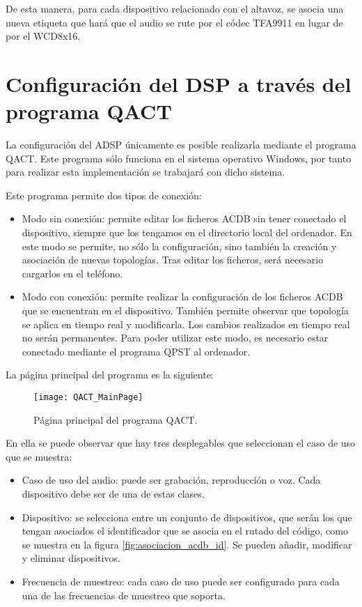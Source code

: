 De esta manera, para cada dispositivo relacionado con el altavoz, se asocia una nueva etiqueta que hará que el audio se rute por el códec TFA9911 en lugar de por el WCD8x16.

\section{Configuración del DSP a través del programa QACT} \label{sec:conf_DSP}
La configuración del \gls{ADSP} únicamente es posible realizarla mediante el programa \gls{QACT}. Este programa sólo funciona en el sistema operativo Windows, por tanto para realizar esta implementación se trabajará con dicho sistema.

Este programa permite dos tipos de conexión:
\begin{itemize}
	\item{Modo sin conexión: permite editar los ficheros \gls{ACDB} sin tener conectado el dispositivo, siempre que los tengamos en el directorio local del ordenador. En este modo se permite, no sólo la configuración, sino también la creación y asociación de nuevas topologías. Tras editar los ficheros, será necesario cargarlos en el teléfono.}
	\item{Modo con conexión: permite realizar la configuración de los ficheros \gls{ACDB} que se encuentran en el dispositivo. También permite observar que topología se aplica en tiempo real y modificarla. Los cambios realizados en tiempo real no serán permanentes. Para poder utilizar este modo, es necesario estar conectado mediante el programa \gls{QPST} al ordenador.}
\end{itemize}

La página principal del programa es la siguiente:

\begin{figure}[H]
	\centering
	\texttt{[image: QACT\_MainPage]}
	\caption{Página principal del programa QACT.} 
	\label{fig:qact_main}
\end{figure}

En ella se puede observar que hay tres desplegables que seleccionan el caso de uso que se muestra:
\begin{itemize}
	\item{Caso de uso del audio: puede ser grabación, reproducción o voz. Cada dispositivo debe ser de una de estas clases.}
	\item{Dispositivo: se selecciona entre un conjunto de dispositivos, que serán los que tengan asociados el identificador que se asocia en el rutado del código, como se muestra en la figura \ref{fig:asociacion_acdb_id}. Se pueden añadir, modificar y eliminar dispositivos.}
	\item{Frecuencia de muestreo: cada caso de uso puede ser configurado para cada una de las frecuencias de muestreo que soporta.}
\end{itemize}


